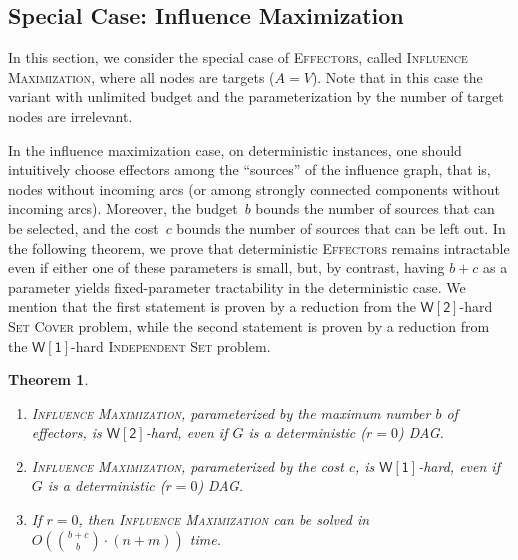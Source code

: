 \documentclass{article}
\newcommand{\wone}{{\mathsf{W[1]}}}
\newcommand{\wtwo}{{\mathsf{W[2]}}}
\newtheorem{theorem}{Theorem}
\newcommand{\probEffectors}{\textsc{Effectors}\xspace}
\begin{document}
\subsection{Special Case: Influence Maximization}\label{section:everythingActive}
In this section, we consider the special case of \probEffectors, called \textsc{Influence Maximization}, where all nodes are targets ($A=V$).
Note that in this case the variant with unlimited budget and the
parameterization by the number of target nodes are irrelevant.

In the influence maximization case, on deterministic instances, one should intuitively choose 
effectors among the ``sources'' of the influence graph, that is, nodes 
without incoming arcs (or among strongly connected components without incoming arcs). 
Moreover, the budget~$b$ bounds the number of sources that can be selected,
and the cost~$c$ bounds the number of sources that can be left out. 
In the following theorem,
we prove that deterministic \probEffectors remains intractable even if either one of
these parameters is small,
but, by contrast,
having $b+c$ as a parameter yields fixed-parameter tractability in the deterministic case.
We mention that the first statement is proven by a reduction from the $\wtwo$-hard \textsc{Set Cover} problem,
while the second statement is proven by a reduction from the $\wone$-hard \textsc{Independent Set} problem.

\begin{theorem}
  \label{thm:infmax}
  \mbox{}
  \begin{enumerate}
    \item \textsc{Influence Maximization},
      parameterized by the maximum number $b$ of effectors,
      is $\wtwo$-hard, even if $G$ is a deterministic ($r=0$) DAG.
    \item \textsc{Influence Maximization},
      parameterized by the cost $c$,
      is $\wone$-hard, even if $G$ is a deterministic ($r=0$) DAG.
    \item If $r = 0$,
      then \textsc{Influence Maximization} can be solved in~$O(\binom{b+c}{b} \cdot (n + m))$ time.
  \end{enumerate}
\end{theorem}
\end{document}
